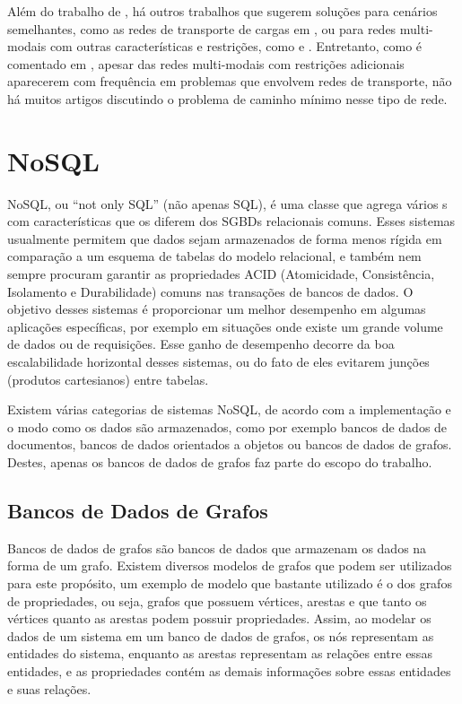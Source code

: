 Além do trabalho de \cite{kao2008}, há outros trabalhos que sugerem soluções para cenários semelhantes, como as redes de transporte de cargas em \cite{Ziliaskopoulos2000486}, ou para redes multi-modais com outras características e restrições, como \cite{Lozano2001225} e \cite{Lozano2002853}. Entretanto, como é comentado em \cite{Lozano2001225}, apesar das redes multi-modais com restrições adicionais aparecerem com frequência em problemas que envolvem redes de transporte, não há muitos artigos discutindo o problema de caminho mínimo nesse tipo de rede. 


\section{NoSQL}

NoSQL, ou ``not only SQL'' (não apenas SQL), é uma classe que agrega vários s com características que os diferem dos SGBDs relacionais comuns.
Esses sistemas usualmente permitem que dados sejam armazenados de forma menos rígida em comparação a um esquema de tabelas do modelo relacional, e também nem sempre procuram garantir as propriedades ACID (Atomicidade, Consistência, Isolamento e Durabilidade) comuns nas transações de bancos de dados.
O objetivo desses sistemas é proporcionar um melhor desempenho em algumas aplicações específicas, por exemplo em situações onde existe um grande volume de dados ou de requisições. Esse ganho de desempenho decorre da boa escalabilidade horizontal desses sistemas, ou do fato de eles evitarem junções (produtos cartesianos) entre tabelas.

Existem várias categorias de sistemas NoSQL, de acordo com a implementação e o modo como os dados são armazenados, como por exemplo bancos de dados de documentos, bancos de dados orientados a objetos ou bancos de dados de grafos.
Destes, apenas os bancos de dados de grafos faz parte do escopo do trabalho.

\subsection{Bancos de Dados de Grafos}


Bancos de dados de grafos são bancos de dados que armazenam os dados na forma de um grafo. Existem diversos modelos de grafos que podem ser utilizados para este propósito, um exemplo de modelo que bastante utilizado é o dos grafos de propriedades, ou seja, grafos que possuem vértices, arestas e que tanto os vértices quanto as arestas podem possuir propriedades.
Assim, ao modelar os dados de um sistema em um banco de dados de grafos, os nós representam as entidades do sistema, enquanto as arestas representam as relações entre essas entidades, e as propriedades contém as demais informações sobre essas entidades e suas relações.

